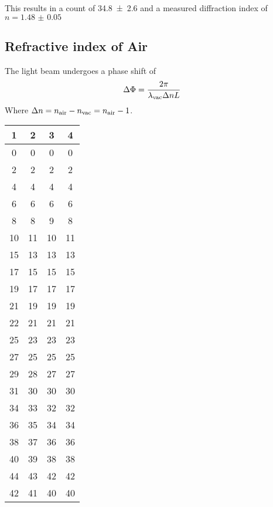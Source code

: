 This results in a count of \num{34.8(26)} and a measured diffraction index of
$n = \num{1.48(5)}$

\subsection{Refractive index of Air}
The light beam undergoes a phase shift of
\begin{align}
	\Delta\Phi = \frac{2 \pi}{\lambda_\text{vac} \Delta n L }
\end{align}
Where $\Delta n = n_\text{air}- n_\text{vac} = n_\text{air}-1 $.

\begin{table}
	\centering
	\begin{tabular}{cccc}
		\toprule
		{1} & {2} & {3} & {4} \\
		\midrule
		0    & 0    & 0    & 0    \\
		2    & 2    & 2    & 2    \\
		4    & 4    & 4    & 4    \\
		6    & 6    & 6    & 6    \\
		8    & 8    & 9    & 8    \\
		10   & 11   & 10   & 11   \\
		15   & 13   & 13   & 13   \\
		17   & 15   & 15   & 15   \\
		19   & 17   & 17   & 17   \\
		21   & 19   & 19   & 19   \\
		22   & 21   & 21   & 21   \\
		25   & 23   & 23   & 23   \\
		27   & 25   & 25   & 25   \\
		29   & 28   & 27   & 27   \\
		31   & 30   & 30   & 30   \\
		34   & 33   & 32   & 32   \\
		36   & 35   & 34   & 34   \\
		38   & 37   & 36   & 36   \\
		40   & 39   & 38   & 38   \\
		44   & 43   & 42   & 42   \\
		42   & 41   & 40   & 40   \\
		\bottomrule
	\end{tabular}
\end{table}
